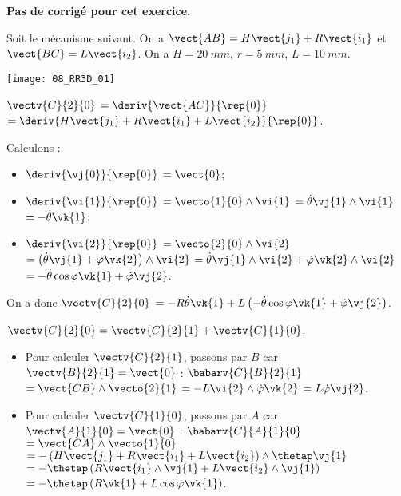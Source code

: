 \normalfalse \difficiletrue \tdifficilefalse
\correctiontrue


\setcounter{numques}{0}
\ifcorrection
\else
\textbf{Pas de corrigé pour cet exercice.}
\fi

\ifprof
\else
Soit le mécanisme suivant. On a $\vect{AB}=H\vect{j_1}+R\vect{i_1}$ et $\vect{BC}=L\vect{i_2}$. On a $H=\SI{20}{mm}$, $r=\SI{5}{mm}$, $L=\SI{10}{mm}$. 
\begin{center}
\texttt{[image: 08\_RR3D\_01]}
\end{center}
\fi

\ifprof
$\vectv{C}{2}{0}$ 
$=\deriv{\vect{AC}}{\rep{0}}$
$=\deriv{H\vect{j_1}+R\vect{i_1}+L\vect{i_2}}{\rep{0}}$.

Calculons : 
\begin{itemize}
\item $\deriv{\vj{0}}{\rep{0}}$ $=\vect{0}$;
\item $\deriv{\vi{1}}{\rep{0}}$ $=\vecto{1}{0} \wedge \vi{1}$ $=\dot{\theta}\vj{1} \wedge \vi{1}$ $=-\dot{\theta}\vk{1}$;
\item $\deriv{\vi{2}}{\rep{0}}$ $=\vecto{2}{0} \wedge \vi{2}$ 
$=\left(\dot{\theta}\vj{1} + \dot{\varphi}\vk{2}\right)\wedge \vi{2}$
$=\dot{\theta}\vj{1}\wedge \vi{2} + \dot{\varphi}\vk{2}\wedge \vi{2}$
$=-\dot{\theta}\cos\varphi\vk{1} + \dot{\varphi}\vj{2}$.
\end{itemize}

On a donc 
$\vectv{C}{2}{0}$ 
$= -R\dot{\theta}\vk{1}+L\left(-\dot{\theta}\cos\varphi\vk{1} + \dot{\varphi}\vj{2}\right)$.


\else
\fi

\ifprof
$\vectv{C}{2}{0}=\vectv{C}{2}{1}+\vectv{C}{1}{0}$.

\begin{itemize}
\item Pour calculer $\vectv{C}{2}{1}$, passons par $B$ car $\vectv{B}{2}{1}=\vect{0}$ :
$\babarv{C}{B}{2}{1}$
$ = \vect{CB}\wedge\vecto{2}{1}$
$ = -L\vi{2}\wedge\dot{\varphi}\vk{2}$
$ = L\dot{\varphi}\vj{2}$.
\item Pour calculer $\vectv{C}{1}{0}$, passons par $A$ car $\vectv{A}{1}{0}=\vect{0}$ :
$\babarv{C}{A}{1}{0}$
$ = \vect{CA}\wedge\vecto{1}{0}$
$ = -\left( H\vect{j_1}+R\vect{i_1}+L\vect{i_2}\right)\wedge\thetap\vj{1}$
$ = -\thetap\left( R\vect{i_1}\wedge\vj{1}+L\vect{i_2}\wedge\vj{1}\right)$
$ = -\thetap\left( R\vk{1}+L\cos\varphi\vk{1}\right)$.
\end{itemize}

